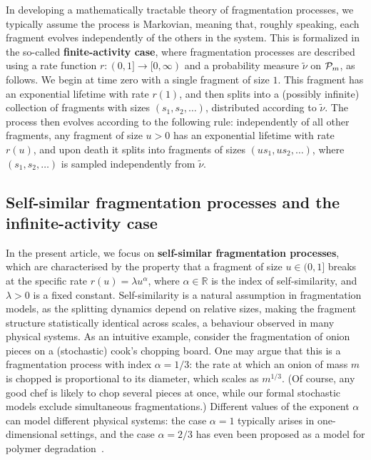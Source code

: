 \documentclass[a4,12pt]{amsart}
\numberwithin{equation}{section}
\newcommand{\MassP}{\mathcal{P}_{\rm m}}
\begin{document}
	In developing a mathematically tractable theory of fragmentation processes,  
	we typically assume the process is Markovian, meaning that, roughly speaking,  
	each fragment evolves independently of the others in the system.  
	This is formalized in the so-called \textbf{finite-activity case},  
	where fragmentation processes are described using a rate function  
	$r \colon (0,1] \to [0,\infty)$ and a probability measure $\tilde{\nu}$ on $\MassP$,  
	as follows.
	We begin at time zero with a single fragment of size $1$.  
	This fragment has an exponential lifetime with rate $r(1)$, and then splits into  
	a (possibly infinite) collection of fragments with sizes $(s_1, s_2, \ldots)$,  
	distributed according to $\tilde{\nu}$.
	The process then evolves according to the following rule:  
	independently of all other fragments, any fragment of size $u > 0$  
	has an exponential lifetime with rate $r(u)$,  
	and upon death it splits into fragments of sizes $(us_1, us_2, \ldots)$,  
	where $(s_1, s_2, \ldots)$ is sampled independently from $\tilde{\nu}$.


\subsection{Self-similar fragmentation processes and the infinite-activity case}

	In the present article, we focus on \textbf{self-similar fragmentation processes},  
	which are characterised by the property that a fragment of size $u \in (0,1]$  
	breaks at the specific rate $r(u) = \lambda u^\alpha$, where $\alpha \in \mathbb{R}$ is the index of  
	self-similarity, and $\lambda > 0$ is a fixed constant.
	Self-similarity is a natural assumption in fragmentation models,  
	as the splitting dynamics depend on relative sizes,  
	making the fragment structure statistically identical across scales,  
	a behaviour observed in many physical systems.
	As an intuitive example, consider the fragmentation of onion pieces on a (stochastic) 
	cook’s chopping board.  
	One may argue that this is a fragmentation process with index $\alpha = 1/3$:  
	the rate at which an onion of mass $m$ is chopped is proportional to its diameter,  
	which scales as $m^{1/3}$.
	(Of course, any good chef is likely to chop several pieces at once,  
	while our formal stochastic models exclude simultaneous fragmentations.)
	Different values of the exponent $\alpha$ can model different physical systems:  
	the case $\alpha = 1$ typically arises in one-dimensional settings,  
	and the case $\alpha = 2/3$ has even been proposed as a 
	model for polymer degradation~\cite{BEE}.
\end{document}
